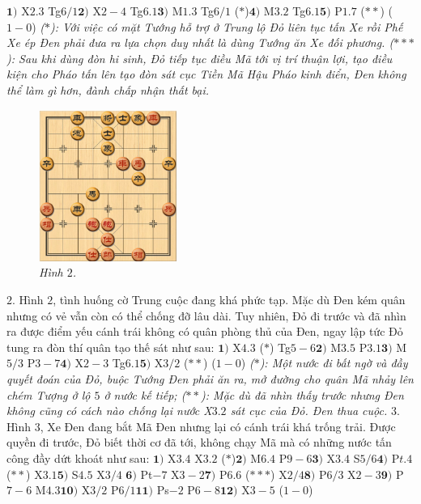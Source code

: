 \begin{multicols}{2}
	$\pmb{1)}$ X$2.3$ Tg$6/1$\quad  $\pmb{2)}$ X$2-4$ Tg$6.1$\quad $\pmb{3)}$ M$1.3$ Tg$6/1$ ($*$)\quad $\pmb{4)}$ M$3.2$ Tg$6.1$\quad  $\pmb{5)}$ P$1.7$ ($**$) ($1-0$)
	\vskip 0.1cm
	\textit{($*$): Với việc có mặt Tướng hỗ trợ ở Trung lộ  Đỏ liên tục tấn Xe rồi Phế Xe ép Đen phải đưa ra lựa chọn duy nhất là dùng Tướng ăn Xe đối phương. 
	\vskip 0.1cm
	($***$): Sau khi dùng đòn hi sinh, Đỏ tiếp tục điều Mã tới vị trí thuận lợi, tạo điều kiện cho Pháo tấn lên tạo đòn sát cục Tiền Mã Hậu Pháo kinh điển, Đen không thể làm gì hơn, đành chấp nhận thất bại.}
	\begin{figure}[H]
		\vspace*{-5pt}
		\centering
		\captionsetup{labelformat= empty, justification=centering}
		\includegraphics[width= 0.4\textwidth]{2}
		\caption{\small\textit{\color{gocco}Hình $2$.}}
		\vspace*{-10pt}
	\end{figure}
	$2.$ Hình $2$, tình huống cờ Trung cuộc đang khá phức tạp. Mặc dù Đen kém quân nhưng có vẻ vẫn còn có thể chống đỡ lâu dài. Tuy nhiên,  Đỏ đi trước và đã nhìn ra được điểm yếu cánh trái không có quân phòng thủ của Đen, ngay lập tức Đỏ tung ra đòn thí quân tạo thế sát như sau:
	\vskip 0.1cm
	$\pmb{1)}$ X$4.3$ ($*$) Tg$5-6$\quad $\pmb{2)}$ M$3.5$ P$3.1$\quad  $\pmb{3)}$ M$5/3$ P$3-7$\quad $\pmb{4)}$ X$2-3$  Tg$6.1$\quad $\pmb{5)}$ X$3/2$ ($**$) ($1-0$)
	\vskip 0.1cm
	\textit{($*$): Một nước đi bất ngờ và đầy quyết đoán của Đỏ, buộc Tướng Đen phải ăn ra, mở đường cho quân Mã nhảy lên chém Tượng ở lộ $5$ ở nước kế tiếp;
	\vskip 0.1cm
	($**$): Mặc dù đã nhìn thấy trước nhưng Đen không cũng có cách nào chống lại nước X$3.2$ sát cục của Đỏ. Đen thua cuộc.}
	\vskip 0.1cm
	$3.$ Hình $3$, Xe Đen đang bắt Mã Đen nhưng lại có cánh trái khá trống trải. Được quyền đi trước, Đỏ biết thời cơ đã tới, không chạy Mã mà có những nước tấn công đầy dứt khoát như sau:
	\vskip 0.1cm
	$\pmb{1)}$	X$3.4$ X$3.2$ ($*$)\quad  $\pmb{2)}$ M$6.4$ P$9-6$\quad  $\pmb{3)}$ X$3.4$ S$5/6$\quad $\pmb{4)}$ P$t.4$ ($**$) X$3.1$\quad $\pmb{5)}$ S$4.5$ X$3/4$ \quad $\pmb{6)}$ Pt$-7$ X$3-2$\quad $\pmb{7)}$ P$6.6$ ($***$) X$2/4$\quad $\pmb{8)}$ P$6/3$ X$2-3$\quad $\pmb{9)}$ P$7-6$ M$4.3$\quad $\pmb{10)}$ X$3/2$ P$6/1$\quad $\pmb{11)}$ Ps$-2$ P$6-8$\quad $\pmb{12)}$ X$3-5$ ($1-0$)

\end{multicols}
